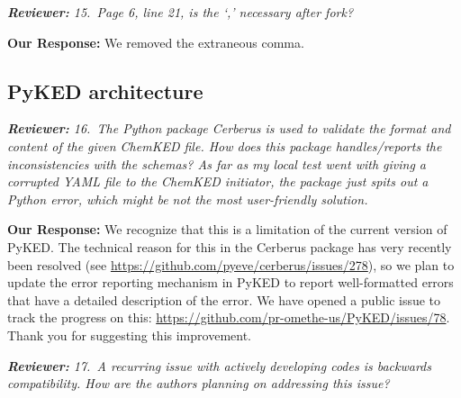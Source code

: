 \documentclass[a4paper,10pt]{elsarticle}
\newenvironment{reviewer}{\vspace{0.5\baselineskip}\begingroup\itshape\textbf{Reviewer:}}{\endgroup}
\newenvironment{response}{\textbf{Our Response:}}{\vspace{0.5\baselineskip}}
\begin{document}
\begin{reviewer}
    15.~Page 6, line 21, is the `,' necessary after fork?
\end{reviewer}

\begin{response}
    We removed the extraneous comma.
\end{response}

\subsection*{PyKED architecture}

\begin{reviewer}
    16.~The Python package Cerberus is used to validate the format and content of the given ChemKED
    file. How does this package handles/reports the inconsistencies with the schemas? As far as my
    local test went with giving a corrupted YAML file to the ChemKED initiator, the package just
    spits out a Python error, which might be not the most user-friendly solution.
\end{reviewer}

\begin{response}
    We recognize that this is a limitation of the current version of PyKED. The technical reason for
    this in the Cerberus package has very recently been resolved (see
    \url{https://github.com/pyeve/cerberus/issues/278}), so we plan to update the error reporting
    mechanism in PyKED to report well-formatted errors that have a detailed description of the
    error. We have opened a public issue to track the progress on this:
    \url{https://github.com/pr-omethe-us/PyKED/issues/78}. Thank you for suggesting this
    improvement.
\end{response}

\begin{reviewer}
    17.~A recurring issue with actively developing codes is backwards compatibility. How are the
    authors planning on addressing this issue?
\end{reviewer}
\end{document}

